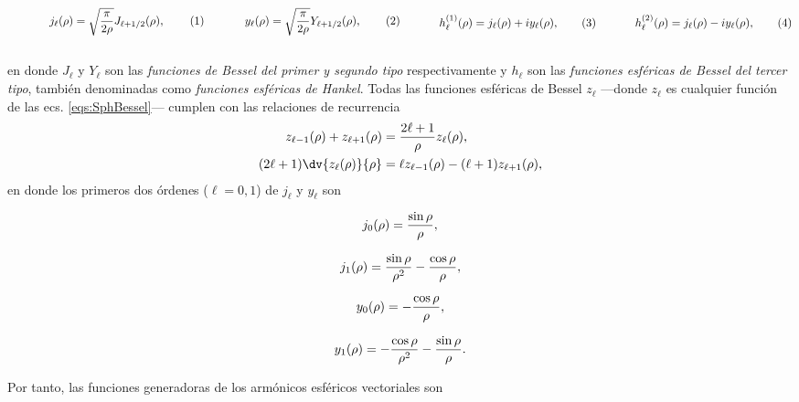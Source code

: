\documentclass[letterpaper,11pt] {article}
\newcommand{\beqhalf}{\noindent \begin{minipage}[c]{.5\linewidth} \begin{equation}}
\newcommand{\eeqhalf}{\end{equation} \end{minipage} }
\newcommand{\eqhalf}[1]{\beqhalf #1 \eeqhalf}
\begin{document}
	\begin{subequations}
	\eqhalf{j_\ell (\rho) = \sqrt{\frac{\pi}{2\rho}} J_{\ell+1/2}(\rho), \label{eq:jn}}
	\eqhalf{y_\ell (\rho) = \sqrt{\frac{\pi}{2\rho}} Y_{\ell+1/2}(\rho), \label{eq:yn}}
	\eqhalf{h_\ell^{(1)} (\rho) = j_\ell(\rho) + i y_\ell(\rho), \label{eq:h1}}
	\eqhalf{h_\ell^{(2)} (\rho) =  j_\ell(\rho) - i y_\ell(\rho), \label{eq:h2}}
	\label{eqs:SphBessel}
	\end{subequations}\\
en donde $J_\ell$ y $Y_\ell$ son las \emph{funciones de Bessel del primer y segundo tipo} respectivamente y $h_\ell$ son las \emph{funciones esféricas de Bessel del tercer tipo}, también denominadas como \emph{funciones esféricas de Hankel}. Todas las funciones esféricas de Bessel $z_\ell$ ---donde $z_\ell$ es cualquier función de las ecs. \eqref{eqs:SphBessel}--- cumplen con las  relaciones de recurrencia
	\begin{align}
	z_{\ell-1}(\rho) + z_{\ell+1}(\rho) &=\frac{2\ell+1}{\rho} z_\ell(\rho),\\
	(2\ell + 1) \dv{z_\ell(\rho)}{\rho} &= \ell z_{\ell-1}(\rho) - (\ell+1)z_{\ell+1}(\rho),
	\end{align}
en donde los primeros dos órdenes ($\ell=0,1$) de $j_\ell$ y $y_\ell$ son\\

	\eqhalf{j_0(\rho) = \frac{\sin\rho}{\rho}, \notag}
	\eqhalf{j_1(\rho) = \frac{\sin\rho}{\rho^2}-\frac{\cos\rho}{\rho},\notag}
	\eqhalf{y_0(\rho) = -\frac{\cos\rho}{\rho},\notag}
	\eqhalf{y_1(\rho) = -\frac{\cos\rho}{\rho^2}-\frac{\sin\rho}{\rho}.\notag}

Por tanto, las funciones generadoras de los armónicos esféricos vectoriales son\\
\end{document}

